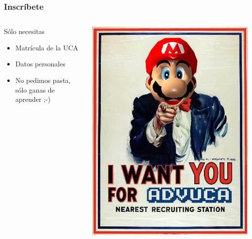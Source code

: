 \begin{frame}
	\frametitle{Inscríbete}
	
	\begin{columns}[c]
		\column{150pt}
		\begin{block}{Sólo necesitas}
            \begin{itemize}
                \item Matrícula de la UCA
		\item Datos personales
		\item No pedimos pasta, sólo ganas de aprender ;-)
            \end{itemize}            
        \end{block}        
		\column{150pt}
		\begin{center}
			\includegraphics[scale=0.22]{img/iwantyou.jpg}
		\end{center}
	\end{columns} 
	
\end{frame}
